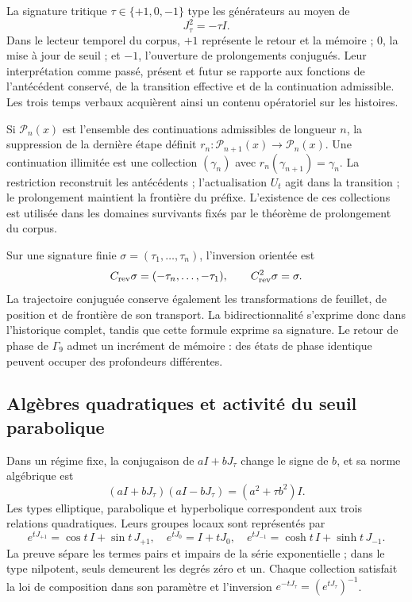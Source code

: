 La signature tritique \(\tau\in\{+1,0,-1\}\) type les générateurs au moyen de
\[
 J_\tau^2=-\tau I.
\]
Dans le lecteur temporel du corpus, \(+1\) représente le retour et la mémoire ; \(0\), la mise à jour de seuil ; et \(-1\), l'ouverture de prolongements conjugués. Leur interprétation comme passé, présent et futur se rapporte aux fonctions de l'antécédent conservé, de la transition effective et de la continuation admissible. Les trois temps verbaux acquièrent ainsi un contenu opératoriel sur les histoires.

Si \(\mathcal P_n(x)\) est l'ensemble des continuations admissibles de longueur \(n\), la suppression de la dernière étape définit \(r_n:\mathcal P_{n+1}(x)\to\mathcal P_n(x)\). Une continuation illimitée est une collection \((\gamma_n)\) avec \(r_n(\gamma_{n+1})=\gamma_n\). La restriction reconstruit les antécédents ; l'actualisation \(U_t\) agit dans la transition ; le prolongement maintient la frontière du préfixe. L'existence de ces collections est utilisée dans les domaines survivants fixés par le théorème de prolongement du corpus.

Sur une signature finie \(\sigma=(\tau_1,\ldots,\tau_n)\), l’inversion
orientée est
\[
 C_{\rm rev}\sigma=(-\tau_n,\ldots,-\tau_1),
 \qquad C_{\rm rev}^2\sigma=\sigma.
\]
La trajectoire conjuguée conserve également les transformations de feuillet, de position et de frontière de son transport. La bidirectionnalité s'exprime donc dans l'historique complet, tandis que cette formule exprime sa signature. Le retour de phase de \(\Gamma_9\) admet un incrément de mémoire : des états de phase identique peuvent occuper des profondeurs différentes.

\subsection{Algèbres quadratiques et activité du seuil parabolique}

Dans un régime fixe, la conjugaison de \(aI+bJ_\tau\) change le signe de \(b\), et sa norme algébrique est
\[
 (aI+bJ_\tau)(aI-bJ_\tau)=(a^2+\tau b^2)I.
\]
Les types elliptique, parabolique et hyperbolique correspondent aux trois
relations quadratiques. Leurs groupes locaux sont représentés par
\[
 e^{tJ_{+1}}=\cos t\,I+\sin t\,J_{+1},\quad
 e^{tJ_0}=I+tJ_0,\quad
 e^{tJ_{-1}}=\cosh t\,I+\sinh t\,J_{-1}.
\]
La preuve sépare les termes pairs et impairs de la série exponentielle ; dans le type nilpotent, seuls demeurent les degrés zéro et un. Chaque collection satisfait la loi de composition dans son paramètre et l'inversion \(e^{-tJ_\tau}=(e^{tJ_\tau})^{-1}\).


